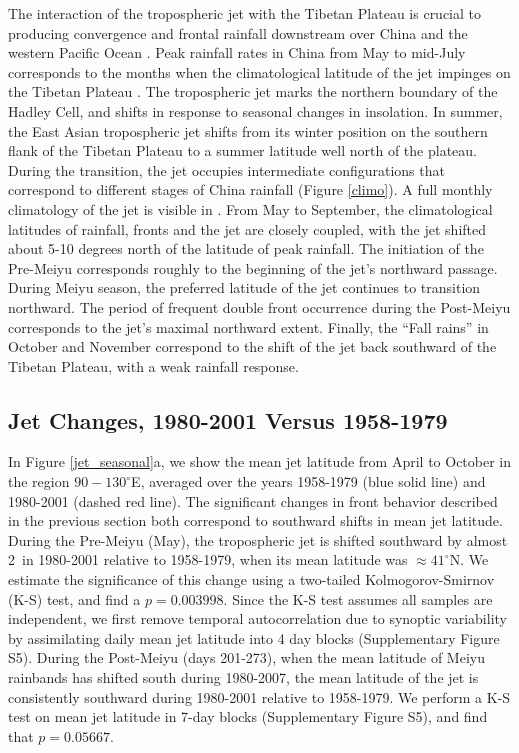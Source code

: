 \documentclass[draft,grl]{AGUTeX}
\begin{document}
\begin{article}
	The interaction of the tropospheric jet with the Tibetan Plateau is crucial to producing convergence and frontal rainfall downstream over China and the western Pacific Ocean \citep{Molnar2010,Sampe2010,Chen2014}. Peak rainfall rates in China from May to mid-July corresponds to the months when the climatological latitude of the jet impinges on the Tibetan Plateau \citep{Schiemann2009}. The tropospheric jet marks the northern boundary of the Hadley Cell, and shifts in response to seasonal changes in insolation. In summer, the East Asian tropospheric jet shifts from its winter position on the southern flank of the Tibetan Plateau to a summer latitude well north of the plateau. During the transition, the jet occupies intermediate configurations that correspond to different stages of China rainfall (Figure \ref{climo}). A full monthly climatology of the jet is visible in \citet{Schiemann2009}. From May to September,  the climatological latitudes of rainfall, fronts and the jet are closely coupled, with the jet shifted about 5-10 degrees north of the latitude of peak rainfall. The initiation of the Pre-Meiyu corresponds roughly to the beginning of the jet's northward passage. During Meiyu season, the preferred latitude of the jet continues to transition northward. The period of frequent double front occurrence during the Post-Meiyu corresponds to the jet's maximal northward extent. Finally, the ``Fall rains'' in October and November correspond to the shift of the jet back southward of the Tibetan Plateau, with a weak rainfall response.
	
\subsection{Jet Changes, 1980-2001 Versus 1958-1979}

	In Figure \ref{jet_seasonal}a, we show the mean jet latitude from April to October in the region $90-130^\circ$E, averaged over the years 1958-1979 (blue solid line) and 1980-2001 (dashed red line). The significant changes in front behavior described in the previous section both correspond to southward shifts in mean jet latitude. During the Pre-Meiyu (May), the tropospheric jet is shifted southward by almost 2\textdegree\ in 1980-2001 relative to 1958-1979, when its mean latitude was $\approx 41^\circ$N. We estimate the significance of this change using a two-tailed Kolmogorov-Smirnov (K-S) test, and find a $p=0.003998$. Since the K-S test assumes all samples are independent, we first remove temporal autocorrelation due to synoptic variability by assimilating daily mean jet latitude into 4 day blocks (Supplementary Figure S5). During the Post-Meiyu (days 201-273), when the mean latitude of Meiyu rainbands has shifted south during 1980-2007, the mean latitude of the jet is consistently southward during 1980-2001 relative to 1958-1979. We perform a K-S test on mean jet latitude in 7-day blocks (Supplementary Figure S5), and find that $p=0.05667$.
		

\end{article}
\end{document}
